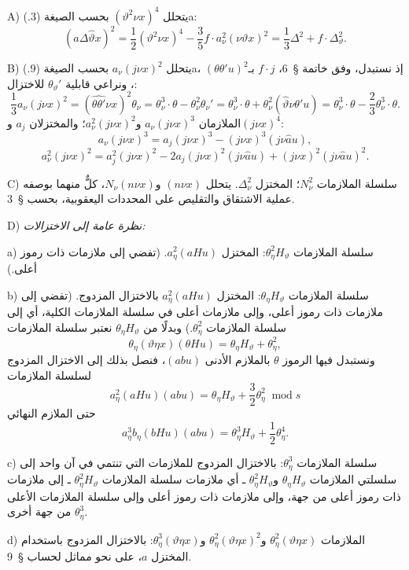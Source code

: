 \documentclass[11pt]{article}
\providecommand{\A}{\Delta}
\providecommand{\modu}[1]{\;\operatorname{mod} #1}
\begin{document}
\noindent A) يتحلل $(\vartheta^2\nu x)^4$ بحسب الصيغة (3.)a:
\[
(a\A\widehat{\vartheta}x)^2=\frac12(\vartheta^2\nu x)^4-\frac35 f\cdot a_\nu^2(\nu\vartheta x)^2
=\frac13\A^2+f\cdot\A_\vartheta^2.
\]

\noindent B) يتحلل $a_\nu(j\nu x)^2$ بحسب الصيغة (9.)a، إذ نستبدل، وفق خاتمة \S\ 6، $f\cdot j$ بـ$(\theta\theta'u)^2$، ونراعي قابلية $\theta_\vartheta'$ للاختزال:
\[
\frac13a_\nu(j\nu x)^2=(\widehat{\theta\theta'}\nu x)^2\theta_\nu
=\theta_\nu^3\cdot\theta-\theta_\nu^2\theta_\nu'
=\theta_\nu^3\cdot\theta+\theta_\nu^2(\widehat{\vartheta}\nu\theta'u)
=\theta_\nu^3\cdot\theta-\frac23\theta_\nu^3\cdot\theta.
\]
الملازمان $a_\nu(j\nu x)^3$ و$a_\nu^2(j\nu x)^2$؛ والمختزلان $a_j$ و$(j\nu x)^4$:
\[
a_\nu(j\nu x)^3=a_j(j\nu x)^3-(j\nu x)^3(j\nu\widehat{a}u),
\]
\[
a_\nu^2(j\nu x)^2=a_j^2(j\nu x)^2-2a_j(j\nu x)^2(j\nu\widehat{a}u)+(j\nu x)^2(j\nu\widehat{a}u)^2.
\]

\noindent C) سلسلة الملازمات $N_\nu^2$؛ المختزل $\A_\nu^2$.
يتحلل $(n\nu x)$ و$N_\nu(n\nu x)$، كلٌّ منهما بوصفه عملية الاشتقاق والتقليص على المحددات اليعقوبية، بحسب \S\ 3.

\noindent D) \emph{نظرة عامة إلى الاختزالات:}

a) سلسلة الملازمات $\theta_\eta^2H_\vartheta$: المختزل $a_\eta^2(aHu)$. (تفضي إلى ملازمات ذات رموز أعلى.)

b) سلسلة الملازمات $\theta_\eta H_\vartheta$: المختزل $a_\eta^2(aHu)$ بالاختزال المزدوج.
(تفضي إلى ملازمات ذات رموز أعلى، وإلى ملازمات أعلى في سلسلة الملازمات الكلية، أي إلى سلسلة الملازمات $\theta_\eta^2$.) وبدلًا من $\theta_\eta H_\vartheta$ نعتبر سلسلة الملازمات
\[
\theta_\eta(\vartheta\eta x)(\theta Hu)=\theta_\eta H_\vartheta+\theta_\eta^2,
\]
ونستبدل فيها الرموز $\theta$ بالملازم الأدنى $(abu)$، فنصل بذلك إلى الاختزال المزدوج لسلسلة الملازمات
\[
a_\eta^2(aHu)(abu)=\theta_\eta H_\vartheta+\frac32\theta_\eta^2\modu{s}
\]
حتى الملازم النهائي
\[
a_\eta^3b_\eta(bHu)(abu)=\theta_\eta^3H_\vartheta+\frac12\theta_\eta^4.
\]

c) سلسلة الملازمات $\theta_\eta^3$: بالاختزال المزدوج للملازمات التي تنتمي في آن واحد إلى سلسلتي الملازمات $\theta_\eta H_\vartheta$ و$\theta_\eta^2H_\vartheta$ ـ أي ملازمات سلسلة الملازمات $\theta_\eta^2H_\vartheta$ ـ إلى ملازمات ذات رموز أعلى من جهة، وإلى ملازمات ذات رموز أعلى وإلى سلسلة الملازمات الأعلى $\theta_\eta^3$ من جهة أخرى.

d) الملازمات $\theta_\eta^2(\vartheta\eta x)$ و$\theta_\eta^2(\vartheta\eta x)^2$ و$\theta_\eta^3(\vartheta\eta x)$: بالاختزال المزدوج باستخدام المختزل $a$، على نحو مماثل لحساب \S\ 9.
\end{document}
